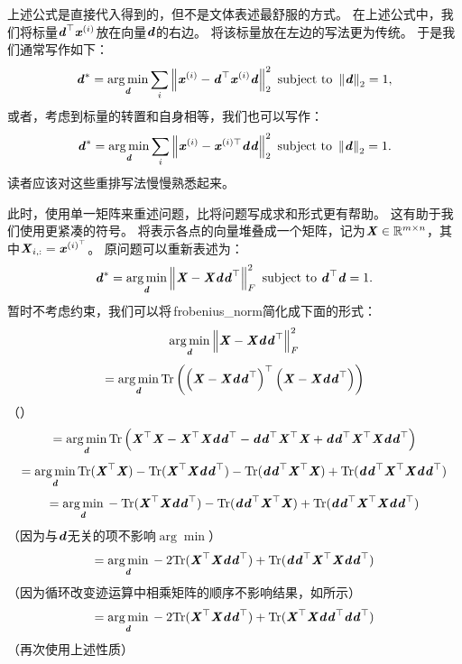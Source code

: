 
上述公式是直接代入得到的，但不是文体表述最舒服的方式。
在上述公式中，我们将标量$\Vd^\top\Vx^{(i)}$放在向量$\Vd$的右边。
将该标量放在左边的写法更为传统。
于是我们通常写作如下：
\begin{equation}
\label{eq:2.68}
    \Vd^* = \underset{\Vd}{\arg\min} \sum_i \norm{\Vx^{(i)} - \Vd^\top \Vx^{(i)}\Vd}_2^2
        \text{ subject to } \norm{\Vd}_2 = 1,
\end{equation}
或者，考虑到标量的转置和自身相等，我们也可以写作：
\begin{equation}
    \Vd^* = \underset{\Vd}{\arg\min} \sum_i \norm{\Vx^{(i)} - \Vx^{(i)\top}\Vd\Vd}_2^2
        \text{ subject to } \norm{\Vd}_2 = 1.
\end{equation}
读者应该对这些重排写法慢慢熟悉起来。


此时，使用单一矩阵来重述问题，比将问题写成求和形式更有帮助。
这有助于我们使用更紧凑的符号。
将表示各点的向量堆叠成一个矩阵，记为$\MX\in\SetR^{m\times n}$，其中$\MX_{i,:}=\Vx^{(i)^\top}$。
原问题可以重新表述为：
\begin{equation}
    \Vd^* = \underset{\Vd}{\arg\min} \norm{\MX - \MX\Vd\Vd^\top}_F^2
        \text{ subject to } \Vd^\top \Vd = 1.
\end{equation}
暂时不考虑约束，我们可以将\,\gls{frobenius_norm}简化成下面的形式：
\begin{equation}
     \underset{\Vd}{\arg\min} \norm{\MX - \MX \Vd\Vd^\top}_F^2
\end{equation}
\begin{equation}
    = \underset{\Vd}{\arg\min} \, \Tr \left( \left( \MX - \MX \Vd\Vd^\top  \right)^\top \left( \MX - \MX \Vd\Vd^\top  \right) \right)
\end{equation}
（）
\begin{equation}
    = \underset{\Vd}{\arg\min} \, \Tr \left( \MX^\top\MX - \MX^\top\MX \Vd\Vd^\top - \Vd\Vd^\top \MX^\top\MX + \Vd\Vd^\top \MX^\top\MX\Vd\Vd^\top  \right)
\end{equation}
\begin{equation}
    = \underset{\Vd}{\arg\min} \, \Tr( \MX^\top\MX)  - \Tr(\MX^\top\MX \Vd\Vd^\top)  - \Tr(\Vd\Vd^\top \MX^\top\MX) + \Tr(\Vd\Vd^\top \MX^\top\MX\Vd\Vd^\top)
\end{equation}
\begin{equation}
    = \underset{\Vd}{\arg\min} \, - \Tr(\MX^\top\MX \Vd\Vd^\top)  - \Tr(\Vd\Vd^\top \MX^\top\MX) + \Tr(\Vd\Vd^\top \MX^\top\MX\Vd\Vd^\top)
\end{equation}
（因为与$\Vd$无关的项不影响$\arg\min$）
\begin{equation}
    = \underset{\Vd}{\arg\min} \, - 2\Tr(\MX^\top\MX \Vd\Vd^\top) + \Tr(\Vd\Vd^\top \MX^\top\MX\Vd\Vd^\top)
\end{equation}
（因为循环改变迹运算中相乘矩阵的顺序不影响结果，如所示）
\begin{equation}
    = \underset{\Vd}{\arg\min} \, - 2\Tr(\MX^\top\MX \Vd\Vd^\top) + \Tr(\MX^\top\MX\Vd\Vd^\top\Vd\Vd^\top )
\end{equation}
（再次使用上述性质）

